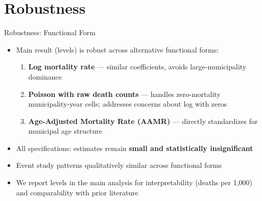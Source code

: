 \documentclass[aspectratio=169,usenames,dvipsnames]{beamer}
\newcommand{\smallcite}[1]{{\footnotesize\textcolor{Blue}{\citep{#1}}}}
\begin{document}

\section{Robustness}

\begin{frame}{Robustness: Functional Form}\label{robustness_ff}
\small
\begin{itemize}
  \item[$\circ$] Main result (levels) is robust across alternative functional forms:
    \vspace{4pt}
    \begin{enumerate}
      \item \textbf{Log mortality rate} --- similar coefficients, avoids large-municipality dominance
      \vspace{4pt}
      \item \textbf{Poisson with raw death counts} --- handles zero-mortality municipality-year cells; addresses \smallcite{ChenRoth2024QJE} concerns about log with zeros
      \vspace{4pt}
      \item \textbf{Age-Adjusted Mortality Rate (AAMR)} --- directly standardizes for municipal age structure
    \end{enumerate}
  \vspace{8pt}
  \item[$\circ$] All specifications: estimates remain \textbf{small and statistically insignificant}
  \vspace{8pt}
  \item[$\circ$] Event study patterns qualitatively similar across functional forms
  \vspace{8pt}
  \item[$\circ$] We report levels in the main analysis for interpretability (deaths per 1,000) and comparability with prior literature
\end{itemize}
\end{frame}
\end{document}
